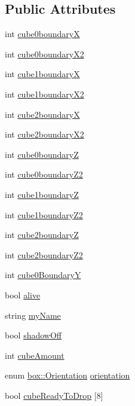 \subsection*{Public Attributes}
\begin{DoxyCompactItemize}
\item 
int \hyperlink{classbox_aece931ab7a442ce512195e62d425f003}{cube0boundary\-X}
\item 
int \hyperlink{classbox_ac537ee9d62e0ce4d2547abf71e162ecc}{cube0boundary\-X2}
\item 
int \hyperlink{classbox_a977f1c22d1535732f20140b150d1bedf}{cube1boundary\-X}
\item 
int \hyperlink{classbox_a8f9f43fe283022beea21a5da3f7e31bd}{cube1boundary\-X2}
\item 
int \hyperlink{classbox_a6e87c5e202ad004d15e7f2d89700b89f}{cube2boundary\-X}
\item 
int \hyperlink{classbox_af34d8a2cf54602fb899ba5a93ef77a2f}{cube2boundary\-X2}
\item 
int \hyperlink{classbox_a90c20bbb34a5a9ae744e3fe77bf399d6}{cube0boundary\-Z}
\item 
int \hyperlink{classbox_a72efab0f58db398d43382cf8156f45f1}{cube0boundary\-Z2}
\item 
int \hyperlink{classbox_a061c1833454d8d4fc9c706b60259315b}{cube1boundary\-Z}
\item 
int \hyperlink{classbox_a2db514751a0641e59c25473615eb165b}{cube1boundary\-Z2}
\item 
int \hyperlink{classbox_a64c685cd4b334e1d72b7f14c8a55f970}{cube2boundary\-Z}
\item 
int \hyperlink{classbox_a16fb873fcc45bf9e0e3aec4f94bed5a1}{cube2boundary\-Z2}
\item 
int \hyperlink{classbox_a9e1a485f4294e148ae46da563fb59405}{cube0\-Boundary\-Y}
\item 
bool \hyperlink{classbox_ad8b435145432f780c4e056953e23e17f}{alive}
\item 
string \hyperlink{classbox_a2350aca4cfcf3a648ef649e1b5fccabe}{my\-Name}
\item 
bool \hyperlink{classbox_aede30efa073f3c74b5c625742ab99deb}{shadow\-Off}
\item 
int \hyperlink{classbox_a1b4e32a86f15ec53e16cdf1b963b5c34}{cube\-Amount}
\item 
enum \hyperlink{classbox_a9cfa5b85cd77bd929b7611f5823fa3ba}{box\-::\-Orientation} \hyperlink{classbox_ab36d34b3d985c2631f6e4feb864675ab}{orientation}
\item 
bool \hyperlink{classbox_abe346da44b7ef7b328b4a796b120d1e7}{cube\-Ready\-To\-Drop} \mbox{[}8\mbox{]}

\end{DoxyCompactItemize}
